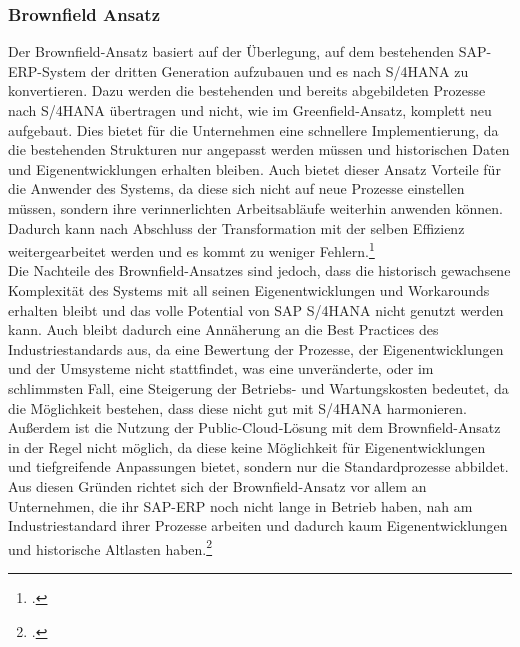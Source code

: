 \subsubsection{Brownfield Ansatz}
Der Brownfield-Ansatz basiert auf der Überlegung, auf dem bestehenden SAP-ERP-System der dritten Generation aufzubauen und es nach S/4HANA zu konvertieren. Dazu werden die bestehenden und bereits abgebildeten Prozesse nach S/4HANA übertragen und nicht, wie im Greenfield-Ansatz, komplett neu aufgebaut. Dies bietet für die Unternehmen eine schnellere Implementierung, da die bestehenden Strukturen nur angepasst werden müssen und historischen Daten und Eigenentwicklungen erhalten bleiben. Auch bietet dieser Ansatz Vorteile für die Anwender des Systems, da diese sich nicht auf neue Prozesse einstellen müssen, sondern ihre verinnerlichten Arbeitsabläufe weiterhin anwenden können. Dadurch kann nach Abschluss der Transformation mit der selben Effizienz weitergearbeitet werden und es kommt zu weniger Fehlern.\footcite[Vgl.][]{gambit-transformation}
\\Die Nachteile des Brownfield-Ansatzes sind jedoch, dass die historisch gewachsene Komplexität des Systems mit all seinen Eigenentwicklungen und Workarounds erhalten bleibt und das volle Potential von SAP S/4HANA nicht genutzt werden kann. Auch bleibt dadurch eine Annäherung an die Best Practices des Industriestandards aus, da eine Bewertung der Prozesse, der Eigenentwicklungen und der Umsysteme nicht stattfindet, was eine unveränderte, oder im schlimmsten Fall, eine Steigerung der Betriebs- und Wartungskosten bedeutet, da die Möglichkeit bestehen, dass diese nicht gut mit S/4HANA harmonieren. Außerdem ist die Nutzung der Public-Cloud-Lösung mit dem Brownfield-Ansatz in der Regel nicht möglich, da diese keine Möglichkeit für Eigenentwicklungen und tiefgreifende Anpassungen bietet, sondern nur die Standardprozesse abbildet. Aus diesen Gründen richtet sich der Brownfield-Ansatz vor allem an Unternehmen, die ihr SAP-ERP noch nicht lange in Betrieb haben, nah am Industriestandard ihrer Prozesse arbeiten und dadurch kaum Eigenentwicklungen und historische \glqq{}Altlasten\grqq{} haben.\footcite[Vgl.][]{gambit-transformation}


